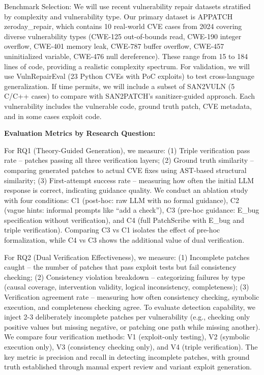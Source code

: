 \documentclass[conference,compsoc]{IEEEtran}
\begin{document}
Benchmark Selection: We will use recent vulnerability repair datasets
stratified by complexity and vulnerability type. Our primary dataset is
APPATCH zeroday\_repair, which contains 10 real-world CVE cases from
2024 covering diverse vulnerability types (CWE-125 out-of-bounds read,
CWE-190 integer overflow, CWE-401 memory leak, CWE-787 buffer overflow,
CWE-457 uninitialized variable, CWE-476 null dereference). These range
from 15 to 184 lines of code, providing a realistic complexity spectrum.
For validation, we will use VulnRepairEval (23 Python CVEs with PoC
exploits) to test cross-language generalization. If time permits, we
will include a subset of SAN2VULN (5 C/C++ cases) to compare with
SAN2PATCH's sanitizer-guided approach. Each vulnerability includes the
vulnerable code, ground truth patch, CVE metadata, and in some cases
exploit code.

\textbf{Evaluation Metrics by Research Question:}

For RQ1 (Theory-Guided Generation), we measure: (1) Triple verification
pass rate -- patches passing all three verification layers; (2) Ground
truth similarity -- comparing generated patches to actual CVE fixes
using AST-based structural similarity; (3) First-attempt success rate --
measuring how often the initial LLM response is correct, indicating
guidance quality. We conduct an ablation study with four conditions: C1
(post-hoc: raw LLM with no formal guidance), C2 (vague hints: informal
prompts like ``add a check''), C3 (pre-hoc guidance: E\_bug
specification without verification), and C4 (full PatchScribe with
E\_bug and triple verification). Comparing C3 vs C1 isolates the effect
of pre-hoc formalization, while C4 vs C3 shows the additional value of
dual verification.

For RQ2 (Dual Verification Effectiveness), we measure: (1) Incomplete
patches caught -- the number of patches that pass exploit tests but fail
consistency checking; (2) Consistency violation breakdown --
categorizing failures by type (causal coverage, intervention validity,
logical inconsistency, completeness); (3) Verification agreement rate --
measuring how often consistency checking, symbolic execution, and
completeness checking agree. To evaluate detection capability, we inject
2-3 deliberately incomplete patches per vulnerability (e.g., checking
only positive values but missing negative, or patching one path while
missing another). We compare four verification methods: V1 (exploit-only
testing), V2 (symbolic execution only), V3 (consistency checking only),
and V4 (triple verification). The key metric is precision and recall in
detecting incomplete patches, with ground truth established through
manual expert review and variant exploit generation.
\end{document}
